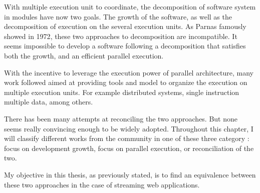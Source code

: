 With multiple execution unit to coordinate, the decomposition of software system in modules have now two goals.
The growth of the software, as well as the decomposition of execution on the several execution units.
As Parnas famously showed in 1972\cite{Parnas1972}, these two approaches to decomposition are incompatible.
It seems impossible to develop a software following a decomposition that satisfies both the growth, and an efficient parallel execution. 

With the incentive to leverage the execution power of parallel architecture, many work followed aimed at providing tools and model to organize the execution on multiple execution units.
For example distributed systems, single instruction multiple data, among others.

There has been many attempts at reconciling the two approaches.
But none seems really convincing enough to be widely adopted.
Throughout this chapter, I will classify different works from the community in one of these three category : focus on development growth, focus on parallel execution, or reconciliation of the two.

My objective in this thesis, as previously stated, is to find an equivalence between these two approaches in the case of streaming web applications.






                                    \endinput


\section{Introduction}

In this section I analyze the current solutions to provide concurrency for web servers.
The criterion for this analysis are :

\begin{itemize}
\item how the solution (language) exposes the memory to the developer.
\item how the solution (language) exposes the invariance on this memory. These two language choices should be representative of the ease for a developer to develop with this language.
\item how the solution (infrastructure) finally extract parallelism based on the memory and its invariance (annotations or not, and how well ).
\item The expected ratio of parallelism over the total execution. and the ratio of communcation over the total state. These two ratios should be representative of the expected speedup in function of the resources made available.
\end{itemize}

